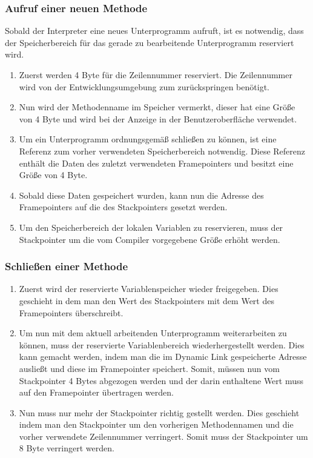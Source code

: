 \subsubsection{Aufruf einer neuen Methode}
Sobald der Interpreter eine neues Unterprogramm aufruft, ist es notwendig, dass der Speicherbereich für das gerade zu bearbeitende Unterprogramm reserviert wird.
\begin{enumerate}
 \item Zuerst werden 4 Byte für die Zeilennummer reserviert. Die Zeilennummer wird von der Entwicklungsumgebung zum zurückspringen benötigt.
 \item Nun wird der Methodenname im Speicher vermerkt, dieser hat eine Größe von 4 Byte und wird bei der Anzeige in der Benutzeroberfläche verwendet.
 \item Um ein Unterprogramm ordnungsgemäß schließen zu können, ist eine Referenz zum vorher verwendeten Speicherbereich notwendig. Diese Referenz enthält die Daten des zuletzt verwendeten Framepointers und besitzt eine Größe von 4 Byte.
 \item Sobald diese Daten gespeichert wurden, kann nun die Adresse des Framepointers auf die des Stackpointers gesetzt werden.
 \item Um den Speicherbereich der lokalen Variablen zu reservieren, muss der Stackpointer um die vom Compiler vorgegebene Größe erhöht werden.
\end{enumerate}
 
\subsubsection{Schließen einer Methode}
\begin{enumerate}
 \item Zuerst wird der reservierte Variablenspeicher wieder freigegeben. Dies geschieht in dem man den Wert des Stackpointers mit dem Wert des Framepointers überschreibt.
 \item Um nun mit dem aktuell arbeitenden Unterprogramm weiterarbeiten zu können, muss der reservierte Variablenbereich wiederhergestellt werden. Dies kann gemacht werden, indem man die im Dynamic Link gespeicherte Adresse ausließt und diese im Framepointer speichert. Somit, müssen nun vom Stackpointer 4 Bytes abgezogen werden und der darin enthaltene Wert muss auf den Framepointer übertragen werden.
 \item Nun muss nur mehr der Stackpointer richtig gestellt werden. Dies geschieht indem man den Stackpointer um den vorherigen Methodennamen und die vorher verwendete Zeilennummer verringert. Somit muss der Stackpointer um 8 Byte verringert werden.
\end{enumerate}

